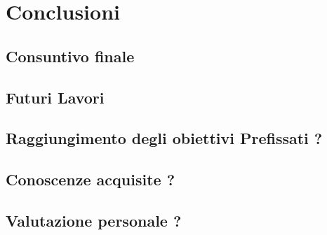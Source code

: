 \chapter{Conclusioni}
\label{cap:conclusioni}

\section{Consuntivo finale}

\section{Futuri Lavori}

\section{Raggiungimento degli obiettivi Prefissati ?}

\section{Conoscenze acquisite ? }

\section{Valutazione personale ? }
